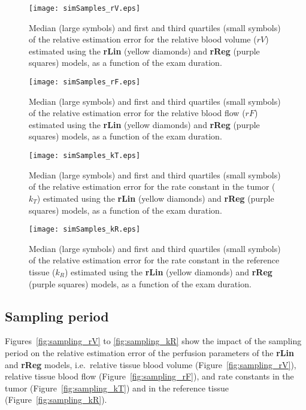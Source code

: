 \begin{subfigures}
    \begin{figure}\centering
        \texttt{[image: simSamples\_rV.eps]}
        \caption{Median (large symbols) and first and third quartiles (small symbols) of the relative estimation error for the relative blood volume ($rV$) estimated using the \textbf{rLin} (yellow diamonds) and \textbf{rReg} (purple squares) models, as a function of the exam duration.}
        \label{fig:examDuration_rV}
    \end{figure}
    \begin{figure}\centering
        \texttt{[image: simSamples\_rF.eps]}
        \caption{Median (large symbols) and first and third quartiles (small symbols) of the relative estimation error for the relative blood flow ($rF$) estimated using the \textbf{rLin} (yellow diamonds) and \textbf{rReg} (purple squares) models, as a function of the exam duration.}
        \label{fig:examDuration_rF}
    \end{figure}
    \begin{figure}\centering
        \texttt{[image: simSamples\_kT.eps]}
        \caption{Median (large symbols) and first and third quartiles (small symbols) of the relative estimation error for the rate constant in the tumor ($k_T$) estimated using the \textbf{rLin} (yellow diamonds) and \textbf{rReg} (purple squares) models, as a function of the exam duration.}
        \label{fig:examDuration_kT}
    \end{figure}
    \begin{figure}\centering
        \texttt{[image: simSamples\_kR.eps]}
        \caption{Median (large symbols) and first and third quartiles (small symbols) of the relative estimation error for the rate constant in the reference tissue ($k_R$) estimated using the \textbf{rLin} (yellow diamonds) and \textbf{rReg} (purple squares) models, as a function of the exam duration.}
        \label{fig:examDuration_kR}
    \end{figure}
\end{subfigures}
\FloatBarrier

\subsection{Sampling period}
Figures~\ref{fig:sampling_rV} to \ref{fig:sampling_kR} show the impact of the sampling period on the relative estimation error of the perfusion parameters of the \textbf{rLin} and \textbf{rReg} models, i.e.~relative tissue blood volume (Figure~\ref{fig:sampling_rV}), relative tissue blood flow (Figure~\ref{fig:sampling_rF}), and rate constants in the tumor (Figure~\ref{fig:sampling_kT}) and in the reference tissue (Figure~\ref{fig:sampling_kR}).

